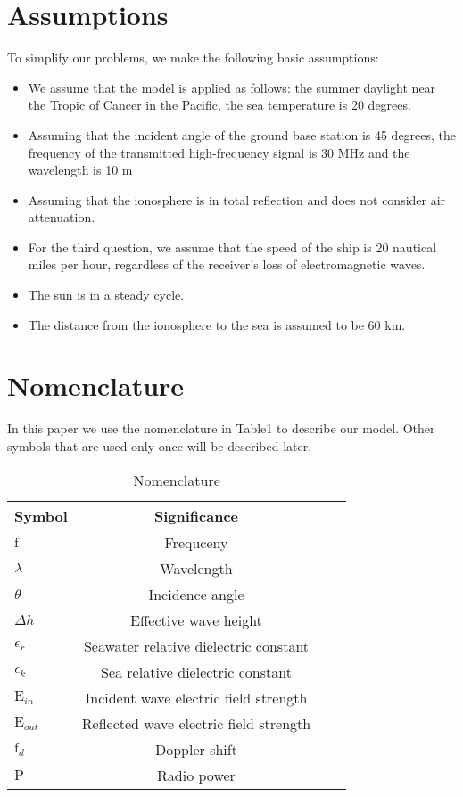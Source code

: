 \documentclass{mcmthesis}
\begin{document}
\section{Assumptions}
To simplify our problems, we make the following basic assumptions:
\begin{itemize}
\item We assume that the model is applied as follows: the summer daylight near the Tropic of Cancer in the Pacific, the sea temperature is 20 degrees.
\item Assuming that the incident angle of the ground base station is 45 degrees, the frequency of the transmitted high-frequency signal is 30 MHz and the wavelength is 10 m
\item Assuming that the ionosphere is in total reflection and does not consider air attenuation.
\item For the third question, we assume that the speed of the ship is 20 nautical miles per hour, regardless of the receiver's loss of electromagnetic waves.
\item The sun is in a steady cycle.
\item The distance from the ionosphere to the sea is assumed to be 60 km.
\end{itemize}
\section{Nomenclature}
In this paper we use the nomenclature in Table1 to describe our model. Other symbols that are used only once will be described later.
\begin{table}[htbp]
\centering  %
\begin{tabular}{lccc}  %
\hline
Symbol &Significance\\ \hline  %
$\mathrm{f}$ &Frequceny \\         %
$\lambda$ &Wavelength \\        %
$\theta$ &Incidence angle \\ 
$\Delta h$ &Effective wave height\\ 
$\epsilon_{r} $ &Seawater relative dielectric constant\\ 
$\epsilon_{k}$ &Sea relative dielectric constant\\
$\mathrm{E}_{in}$ &Incident wave electric field strength\\
$\mathrm{E}_{out}$ &Reflected wave electric field strength\\
$\mathrm{f}_{d}$ &Doppler shift\\
$\mathrm{P}$ &Radio power\\ \hline
\end{tabular}
\caption{Nomenclature}
\end{table}
\end{document}
